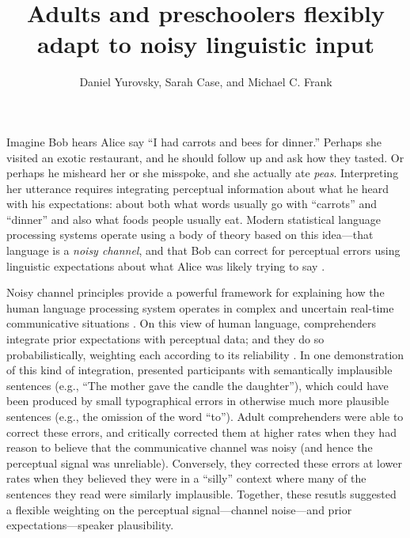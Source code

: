 \documentclass[man,floatsintext]{apa6}
\title{Adults and preschoolers flexibly adapt to noisy linguistic input}
\author{Daniel Yurovsky, Sarah Case, and Michael C. Frank}
\affiliation{Stanford University}
\begin{document}
\maketitle

Imagine Bob hears Alice say ``I had carrots and bees for dinner.'' Perhaps she visited an exotic restaurant, and he should follow up and ask how they tasted. Or perhaps he misheard her or she misspoke, and she actually ate \emph{peas}. Interpreting her utterance requires integrating perceptual information about what he heard with his expectations: about both what words usually go with ``carrots'' and ``dinner'' and also what foods people usually eat. Modern statistical language processing systems operate using a body of theory based on this idea---that language is a \emph{noisy channel}, and that Bob can correct for perceptual errors using linguistic expectations about what Alice was likely trying to say \cite{jelinek1976, shannon1948}. 

Noisy channel principles provide a powerful framework for explaining how the human language processing system operates in complex and uncertain real-time communicative situations \cite{clayards2008, levy2008, jaeger2010, kleinschmidt2015}. On this view of human language, comprehenders integrate prior expectations with perceptual data; and they do so probabilistically, weighting each according to its reliability \cite{ernst2002, jacobs1999}. In one demonstration of this kind of integration,  presented participants with semantically implausible sentences (e.g., ``The mother gave the candle the daughter''), which could have been produced by small typographical errors in otherwise much more plausible sentences (e.g., the omission of the word ``to''). Adult comprehenders were able to correct these errors, and critically corrected them at higher rates when they had reason to believe that the communicative channel was noisy (and hence the perceptual signal was unreliable). Conversely, they corrected these errors at lower rates when they believed they were in a ``silly'' context where many of the sentences they read were similarly implausible. Together, these resutls suggested a flexible weighting on the perceptual signal---channel noise---and prior expectations---speaker plausibility. 
\end{document}
